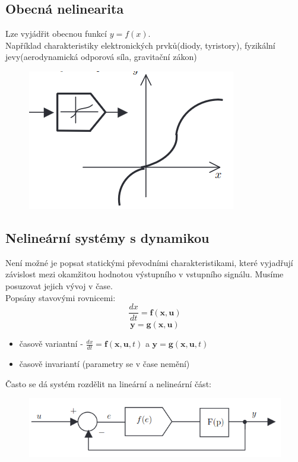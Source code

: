 \subsection*{Obecná nelinearita}
Lze vyjádřit obecnou funkcí \(y = f(x)\).\\
Například charakteristiky elektronických prvků(diody, tyristory), fyzikální jevy(aerodynamická odporová síla, gravitační zákon)
\begin{figure}[h!]
    \centering
    \includegraphics[scale = 0.5]{img/ObecNelin.png}
\end{figure}
\subsection{Nelineární systémy s dynamikou}
Není možné je popsat statickými převodními charakteristikami, které vyjadřují závislost mezi okamžitou hodnotou výstupního v vstupního signálu. Musíme posuzovat jejich vývoj v čase.\\
Popsány stavovými rovnicemi:
\[\frac{dx}{dt}=\mathbf{f}(\mathbf{x},\mathbf{u})\]
\[\mathbf{y}=\mathbf{g}(\mathbf{x},\mathbf{u})\]

\begin{itemize}
    \item časově variantní - \(\frac{dx}{dt}=\mathbf{f}(\mathbf{x},\mathbf{u},t)\) a \(\mathbf{y}=\mathbf{g}(\mathbf{x},\mathbf{u},t)\)
    \item časově invariantí (parametry se v čase nemění)
\end{itemize}
Často se dá systém rozdělit na lineární a nelineární část:
\begin{figure}[h!]
    \centering
    \includegraphics[scale = 0.4]{img/RozdNelLin.png}
\end{figure}
\newpage
